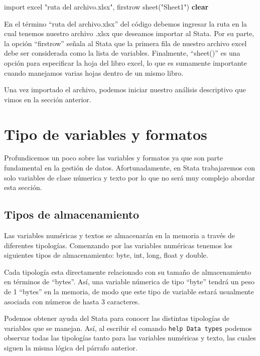 \documentclass[
]{book}
\newenvironment{Shaded}{\begin{snugshade}}{\end{snugshade}}
\newcommand{\KeywordTok}[1]{\textcolor[rgb]{0.13,0.29,0.53}{\textbf{#1}}}
\newcommand{\NormalTok}[1]{#1}
\newcommand{\StringTok}[1]{\textcolor[rgb]{0.31,0.60,0.02}{#1}}
\theoremstyle{definition}
\theoremstyle{definition}
\theoremstyle{definition}
\theoremstyle{definition}
\theoremstyle{remark}
\begin{document}
\begin{Shaded}
\begin{Highlighting}[]
\NormalTok{import excel }\StringTok{"ruta del archivo.xlsx"}\NormalTok{, firstrow sheet(}\StringTok{"Sheet1"}\NormalTok{) }\KeywordTok{clear}
\end{Highlighting}
\end{Shaded}

En el término ``ruta del archivo.xlsx'' del código debemos ingresar la ruta en la cual tenemos nuestro archivo .xlsx que deseamos importar al Stata. Por su parte, la opción ``firstrow'' señala al Stata que la primera fila de nuestro archivo excel debe ser considerada como la lista de variables. Finalmente, ``sheet()'' es una opción para especificar la hoja del libro excel, lo que es sumamente importante cuando manejamos varias hojas dentro de un mismo libro.

Una vez importado el archivo, podemos iniciar nuestro análisis descriptivo que vimos en la sección anterior.

\hypertarget{tipo-de-variables-y-formatos}{%
\section{Tipo de variables y formatos}\label{tipo-de-variables-y-formatos}}

Profundicemos un poco sobre las variables y formatos ya que son parte fundamental en la gestión de datos. Afortunadamente, en Stata trabajaremos con solo variables de clase númerica y texto por lo que no será muy complejo abordar esta sección.

\hypertarget{tipos-de-almacenamiento}{%
\subsection{Tipos de almacenamiento}\label{tipos-de-almacenamiento}}

Las variables numéricas y textos se almacenarán en la memoria a través de diferentes tipologías. Comenzando por las variables numéricas tenemos los siguientes tipos de almacenamiento: byte, int, long, float y double.

Cada tipología esta directamente relacionado con su tamaño de almacenamiento en términos de ``bytes''. Así, una variable númerica de tipo ``byte'' tendrá un peso de 1 ``bytes'' en la memoria, de modo que este tipo de variable estará usualmente asociada con números de hasta 3 caracteres.

Podemos obtener ayuda del Stata para conocer las distintas tipologías de variables que se manejan. Así, al escribir el comando \texttt{help\ Data\ types} podemos observar todas las tipologías tanto para las variables numéricas y texto, las cuales siguen la misma lógica del párrafo anterior.
\end{document}
